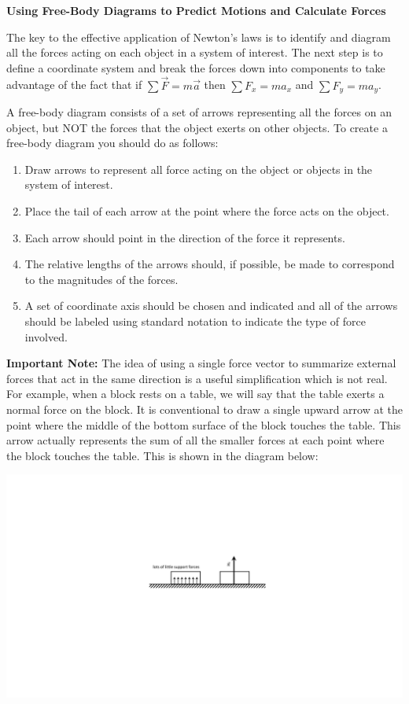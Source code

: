 \textbf{Using Free-Body Diagrams to Predict Motions and Calculate Forces }

The key to the effective application of Newton's laws is to identify and diagram
all the forces acting on each object in a system of interest. The next step
is to define a coordinate system and break the forces down into components to
take advantage of the fact that if \( \sum{\vec F}  = m{\vec a}\) then
\( \sum F_{x} = ma_{x} \) and \( \sum F_{y} =
ma_{y} \).

A free-body diagram consists of a set of arrows representing all the forces
on an object, but NOT the forces that the object exerts on other objects. To
create a free-body diagram you should do as follows: 

\begin{enumerate}
\item Draw arrows to represent all force acting on the object or objects in the system
of interest. 
\item Place the tail of each arrow at the point where the force acts on the object. 
\item Each arrow should point in the direction of the force it represents. 
\item The relative lengths of the arrows should, if possible, be made to correspond
to the magnitudes of the forces. 
\item A set of coordinate axis should be chosen and indicated and all of the arrows
should be labeled using standard notation to indicate the type of force involved.
\end{enumerate}
\textbf{Important Note:} The idea of using a single force vector to summarize
external forces that act in the same direction is a useful simplification which
is not real. For example, when a block rests on a table, we will say that the
table exerts a normal force on the block. It is conventional to draw a single
upward arrow at the point where the middle of the bottom surface of the block
touches the table. This arrow actually represents the sum of all the smaller
forces at each point where the block touches the table. This is shown in the
diagram below:

{\par\centering \includegraphics{friction/normal_forces.pdf} \par}
\vspace{0.3cm}

